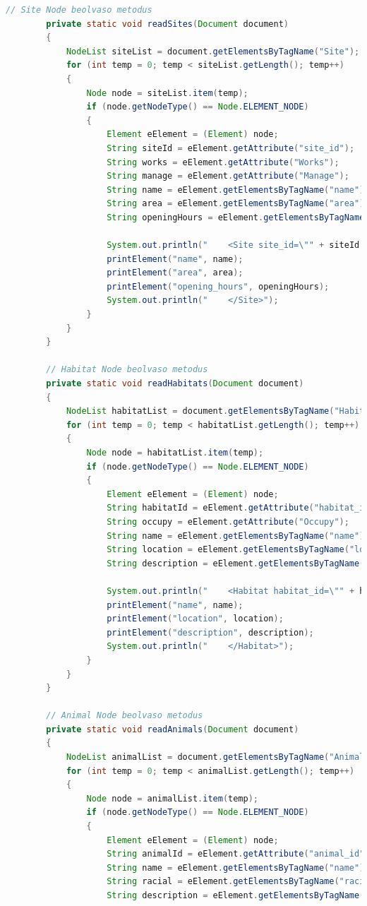 \documentclass[12pt]{report}
\begin{document}
\begin{lstlisting}[caption={DOMReadKLNSPG.java} olvasó program, language=Java]
		// Site Node beolvaso metodus
		private static void readSites(Document document) 
		{
			NodeList siteList = document.getElementsByTagName("Site");
			for (int temp = 0; temp < siteList.getLength(); temp++) 
			{
				Node node = siteList.item(temp);
				if (node.getNodeType() == Node.ELEMENT_NODE) 
				{
					Element eElement = (Element) node;
					String siteId = eElement.getAttribute("site_id");
					String works = eElement.getAttribute("Works");
					String manage = eElement.getAttribute("Manage");
					String name = eElement.getElementsByTagName("name").item(0).getTextContent();
					String area = eElement.getElementsByTagName("area").item(0).getTextContent();
					String openingHours = eElement.getElementsByTagName("opening_hours").item(0).getTextContent();
					
					System.out.println("    <Site site_id=\"" + siteId + "\" Works=\"" + works + "\" Manage=\"" + manage + "\">");
					printElement("name", name);
					printElement("area", area);
					printElement("opening_hours", openingHours);
					System.out.println("    </Site>");
				}
			}
		}
		
		// Habitat Node beolvaso metodus
		private static void readHabitats(Document document) 
		{
			NodeList habitatList = document.getElementsByTagName("Habitat");
			for (int temp = 0; temp < habitatList.getLength(); temp++) 
			{
				Node node = habitatList.item(temp);
				if (node.getNodeType() == Node.ELEMENT_NODE) 
				{
					Element eElement = (Element) node;
					String habitatId = eElement.getAttribute("habitat_id");
					String occupy = eElement.getAttribute("Occupy");
					String name = eElement.getElementsByTagName("name").item(0).getTextContent();
					String location = eElement.getElementsByTagName("location").item(0).getTextContent();
					String description = eElement.getElementsByTagName("description").item(0).getTextContent();
					
					System.out.println("    <Habitat habitat_id=\"" + habitatId + "\" Occupy=\"" + occupy + "\">");
					printElement("name", name);
					printElement("location", location);
					printElement("description", description);
					System.out.println("    </Habitat>");
				}
			}
		}
		
		// Animal Node beolvaso metodus
		private static void readAnimals(Document document) 
		{
			NodeList animalList = document.getElementsByTagName("Animal");
			for (int temp = 0; temp < animalList.getLength(); temp++) 
			{
				Node node = animalList.item(temp);
				if (node.getNodeType() == Node.ELEMENT_NODE) 
				{
					Element eElement = (Element) node;
					String animalId = eElement.getAttribute("animal_id");
					String name = eElement.getElementsByTagName("name").item(0).getTextContent();
					String racial = eElement.getElementsByTagName("racial").item(0).getTextContent();
					String description = eElement.getElementsByTagName("description").item(0).getTextContent();
					

\end{lstlisting}
\end{document}
